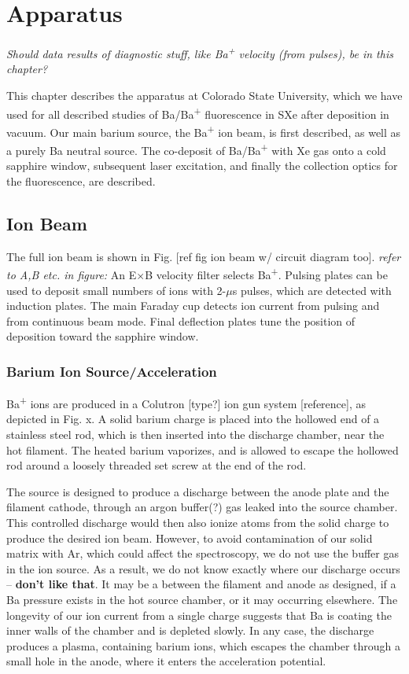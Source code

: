 \chapter{Apparatus}

{\color{gray}\emph{Should data results of diagnostic stuff, like Ba\textsuperscript{+} velocity (from pulses), be in this chapter?}}

This chapter describes the apparatus at Colorado State University, which we have used for all described studies of Ba/Ba\textsuperscript{+} fluorescence in SXe after deposition in vacuum.  Our main barium source, the Ba\textsuperscript{+} ion beam, is first described, as well as a purely Ba neutral source.  The co-deposit of Ba/Ba\textsuperscript{+} with Xe gas onto a cold sapphire window, subsequent laser excitation, and finally the collection optics for the fluorescence, are described.

\section{Ion Beam}

The full ion beam is shown in Fig. [ref fig ion beam w/ circuit diagram too].  {\color{red}\emph{refer to A,B etc. in figure:  }}An E$\times$B velocity filter selects Ba\textsuperscript{+}.  Pulsing plates can be used to deposit small numbers of ions with {\color{red}2-$\mu$s} pulses, which are detected with induction plates.  The main Faraday cup detects ion current from pulsing and from continuous beam mode.  Final deflection plates tune the position of deposition toward the sapphire window.

\subsection{Barium Ion Source/Acceleration}

Ba\textsuperscript{+} ions are produced in a Colutron [type?] ion gun system [reference], as depicted in Fig. x.  A solid barium charge is placed into the hollowed end of a stainless steel rod, which is then inserted into the discharge chamber, near the hot filament.  The heated barium vaporizes, and is allowed to escape the hollowed rod around a loosely threaded set screw at the end of the rod.

The source is designed to produce a discharge between the anode plate and the filament cathode, through an argon buffer(?) gas leaked into the source chamber.  This controlled discharge would then also ionize atoms from the solid charge to produce the desired ion beam.  However, to avoid contamination of our solid matrix with Ar, which could affect the spectroscopy, we do not use the buffer gas in the ion source.  As a result, {\color{red}we do not know exactly where our discharge occurs -- \textbf{don't like that}}.  It may be a between the filament and anode as designed, if a Ba pressure exists in the hot source chamber, or it may occurring elsewhere.  The longevity of our ion current from a single charge suggests that Ba is coating the inner walls of the chamber and is depleted slowly.  In any case, the discharge produces a plasma, containing barium ions, which escapes the chamber through a small hole in the anode, where it enters the acceleration potential.

